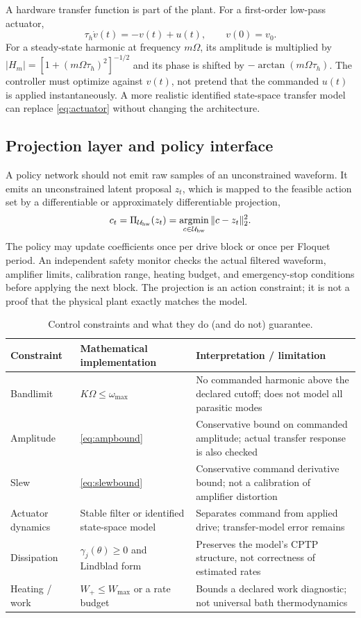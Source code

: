 \documentclass[10pt,twoside]{article}
\DeclareMathOperator{\argmin}{argmin}
\begin{document}
A hardware transfer function is part of the plant. For a first-order low-pass actuator,
\begin{equation}
\tau_h\dot v(t)=-v(t)+u(t),\qquad v(0)=v_0.
\label{eq:actuator}
\end{equation}
For a steady-state harmonic at frequency $m\Omega$, its amplitude is multiplied by
$|H_m|=[1+(m\Omega\tau_h)^2]^{-1/2}$ and its phase is shifted by $-\arctan(m\Omega\tau_h)$. The controller must optimize against $v(t)$, not pretend that the commanded $u(t)$ is applied instantaneously. A more realistic identified state-space transfer model can replace \cref{eq:actuator} without changing the architecture.

\subsection{Projection layer and policy interface}

A policy network should not emit raw samples of an unconstrained waveform. It emits an unconstrained latent proposal $z_t$, which is mapped to the feasible action set by a differentiable or approximately differentiable projection,
\begin{equation}
c_t=\Pi_{\mathcal U_{\rm hw}}(z_t)
=\argmin_{c\in\mathcal U_{\rm hw}}\|c-z_t\|_2^2.
\label{eq:projection}
\end{equation}
The policy may update coefficients once per drive block or once per Floquet period. An independent safety monitor checks the actual filtered waveform, amplifier limits, calibration range, heating budget, and emergency-stop conditions before applying the next block. The projection is an action constraint; it is not a proof that the physical plant exactly matches the model.

\begin{table}[t]
\centering\small
\caption{Control constraints and what they do (and do not) guarantee.}
\label{tab:constraints}
\begin{tabularx}{\textwidth}{p{}XX}
\toprule
Constraint & Mathematical implementation & Interpretation / limitation \\
\midrule
Bandlimit & $K\Omega\leq\omega_{\max}$ & No commanded harmonic above the declared cutoff; does not model all parasitic modes \\
Amplitude & \cref{eq:ampbound} & Conservative bound on commanded amplitude; actual transfer response is also checked \\
Slew & \cref{eq:slewbound} & Conservative command derivative bound; not a calibration of amplifier distortion \\
Actuator dynamics & Stable filter or identified state-space model & Separates command from applied drive; transfer-model error remains \\
Dissipation & $\gamma_j(\theta)\geq0$ and Lindblad form & Preserves the model's CPTP structure, not correctness of estimated rates \\
Heating / work & $W_+\leq W_{\max}$ or a rate budget & Bounds a declared work diagnostic; not universal bath thermodynamics \\
\bottomrule
\end{tabularx}
\end{table}
\end{document}
